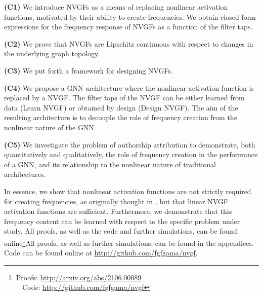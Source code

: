 \begin{list}{}{
        \setlength{\labelwidth}{20pt}
        \setlength{\leftmargin}{17.5pt}
        \setlength{\labelsep}{1.5pt}
        \setlength{\itemsep}{-1pt}
        \setlength{\topsep}{0pt}
        \setlength{\parskip}{0pt}
    }

    \item[\textbf{(C1)}] We introduce NVGFs as a means of replacing nonlinear activation functions, motivated by their ability to create frequencies. We obtain closed-form expressions for the frequency response of NVGFs as a function of the filter taps.
    \item[\textbf{(C2)}] We prove that NVGFs are Lipschitz continuous with respect to changes in the underlying graph topology.
    \item[\textbf{(C3)}] We put forth a framework for designing NVGFs.%
    \item[\textbf{(C4)}] We propose a GNN architecture where the nonlinear activation function is replaced by a NVGF. The filter taps of the NVGF can be either learned from data (Learn NVGF) or obtained by design (Design NVGF). The aim of the resulting architecture is to decouple the role of frequency creation from the nonlinear nature of the GNN.
    \item[\textbf{(C5)}] We investigate the problem of authorship attribution to demonstrate, both quantitatively and qualitatively, the role of frequency creation in the performance of a GNN, and its relationship to the nonlinear nature of traditional architectures.

\end{list}
\fi

In essence, we show that nonlinear activation functions are not strictly required for creating frequencies, as originally thought in \cite{Mallat2012-Scattering, Gama2020-Stability}, but that linear NVGF activation functions are sufficient. Furthermore, we demonstrate that this frequency content can be learned with respect to the specific problem under study. All proofs, as well as the code and further simulations, can be found online\footnote{Proofs: \url{http://arxiv.org/abs/2106.00089} \\ \indent $\ \, \, $ Code: \url{http://github.com/fgfgama/nvgf}}\else All proofs, as well as further simulations, can be found in the appendices. Code can be found online at \url{http://github.com/fgfgama/nvgf}.\fi

